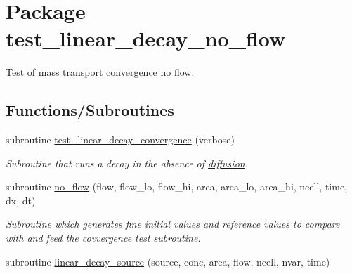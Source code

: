\hypertarget{a00089}{
\section{Package test\_\-linear\_\-decay\_\-no\_\-flow}
\label{a00089}
}
Test of mass transport convergence no flow.  


\subsection*{Functions/Subroutines}
\begin{CompactItemize}
\item 
\hypertarget{a00089_32effc9a412d1bcd59ce0eafde88eef9}{
subroutine \hyperlink{a00089_32effc9a412d1bcd59ce0eafde88eef9}{test\_\-linear\_\-decay\_\-convergence} (verbose)}
\label{a00089_32effc9a412d1bcd59ce0eafde88eef9}

\begin{CompactList}\small\item\em Subroutine that runs a decay in the absence of \hyperlink{a00056}{diffusion}. \item\end{CompactList}\item 
subroutine \hyperlink{a00089_fc187de07f4af8d9e1e862973572b504}{no\_\-flow} (flow, flow\_\-lo, flow\_\-hi, area, area\_\-lo, area\_\-hi, ncell, time, dx, dt)
\begin{CompactList}\small\item\em Subroutine which generates fine initial values and reference values to compare with and feed the covvergence test subroutine. \item\end{CompactList}\item 
subroutine \hyperlink{a00089_3da75bc601f8bb62a62f67492360937a}{linear\_\-decay\_\-source} (source, conc, area, flow, ncell, nvar, time)
\end{CompactItemize}
